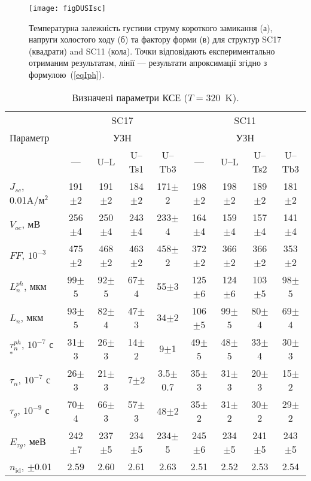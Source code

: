 \begin{figure}
\center
\texttt{[image: figDUSIsc]}%
\caption{\label{figDUSIsc}
Температурна залежність густини струму короткого замикання (а),
напруги холостого ходу (б) та
фактору форми (в)
для структур SC17 (квадрати) and SC11 (кола).
\FigCaptionSSC
Точки відповідають експериментально отриманим результатам,
лінії --- результати апроксимації згідно з формулою~(\ref{eqIph}).
}%
\end{figure}


\begin{table}
\caption{\label{tabSSCParam}Визначені параметри КСЕ ($T=320$~K).
}
\small
\begin{tabular}{|l|c|c|c|c|c|c|c|c|}
\hline
&\multicolumn{4}{c|}{SC17}&\multicolumn{4}{|c|}{SC11}\\
Параметр&\multicolumn{4}{c|}{УЗН}&\multicolumn{4}{|c|}{УЗН}\\ \cline{2-9}
&---&U--L&U--Ts1&U--Tb3&---&U--L&U--Ts2&U--Tb3\\
\hhline{|=========|}
$J_{sc}$, 0.01A/м$^2$&191$\pm$2&191$\pm$2&184$\pm$2&171$\pm$2&198$\pm$2&198$\pm$2&189$\pm$2&181$\pm$2\\ \hline
$V_{oc}$, мВ&256$\pm$4&250$\pm$4&243$\pm$4&233$\pm$4&164$\pm$4&159$\pm$4&157$\pm$4&141$\pm$4\\ \hline
$F\!F$, $10^{-3}$&475$\pm$2&468$\pm$2&463$\pm$2&458$\pm$2&372$\pm$2&366$\pm$2&366$\pm$2&353$\pm$2\\ \hline
$L_n^{ph}$, мкм&99$\pm$5&92$\pm$5&67$\pm$4&55$\pm$3&125$\pm$6&124$\pm$6&103$\pm$5&98$\pm$5\\ \hline
$L_n$, мкм&93$\pm$5&82$\pm$4&47$\pm$3&34$\pm$2&106$\pm$5&99$\pm$5&80$\pm$4&69$\pm$4\\ \hline
$\tau_n^{ph}$, $10^{-7}$ с$^*$&31$\pm$3&26$\pm$3&14$\pm$2&9$\pm$1&49$\pm$5&48$\pm$5&33$\pm$4&30$\pm$3\\ \hline
$\tau_n$, $10^{-7}$ с&26$\pm$3&21$\pm$3&7$\pm$2&3.5$\pm$0.7&35$\pm$3&31$\pm$3&20$\pm$3&15$\pm$2\\ \hline
$\tau_g$, $10^{-9}$ с&70$\pm$4&66$\pm$3&57$\pm$3&48$\pm$2&35$\pm$2&31$\pm$2&30$\pm$2&29$\pm$2\\ \hline
$E_{\tau g}$, меВ&242$\pm$7&237$\pm$5&234$\pm$5&234$\pm$5&245$\pm$6&234$\pm$5&241$\pm$5&243$\pm$5\\ \hline
$n_\mathrm{id}$, $\pm$0.01&2.59&2.60&2.61&2.63&2.51&2.52&2.53&2.54\\ \hline

\end{tabular}
\end{table}
